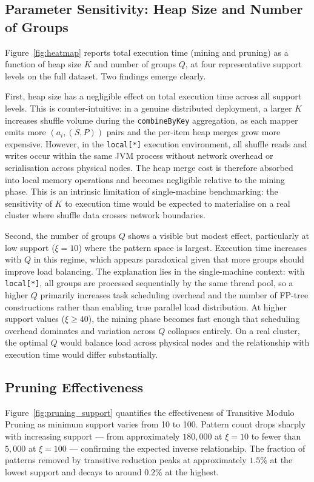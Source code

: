 \documentclass[10pt, twocolumn]{article}
\begin{document}
\subsection{Parameter Sensitivity: Heap Size and Number of Groups}

Figure~\ref{fig:heatmap} reports total execution time (mining and pruning) as
a function of heap size $K$ and number of groups $Q$, at four representative
support levels on the full dataset. Two findings emerge clearly.

First, heap size has a negligible effect on total execution time across all
support levels. This is counter-intuitive: in a genuine distributed
deployment, a larger $K$ increases shuffle volume during the
\texttt{combineByKey} aggregation, as each mapper emits more
$(a_i, (S, P))$ pairs and the per-item heap merges grow more expensive.
However, in the \texttt{local[*]} execution environment, all shuffle reads
and writes occur within the same JVM process without network overhead or
serialisation across physical nodes. The heap merge cost is therefore absorbed
into local memory operations and becomes negligible relative to the mining
phase. This is an intrinsic limitation of single-machine benchmarking: the
sensitivity of $K$ to execution time would be expected to materialise on a
real cluster where shuffle data crosses network boundaries.

Second, the number of groups $Q$ shows a visible but modest effect,
particularly at low support ($\xi{=}10$) where the pattern space is largest.
Execution time increases with $Q$ in this regime, which appears paradoxical
given that more groups should improve load balancing. The explanation lies in
the single-machine context: with \texttt{local[*]}, all groups are processed
sequentially by the same thread pool, so a higher $Q$ primarily increases
task scheduling overhead and the number of FP-tree constructions rather than
enabling true parallel load distribution. At higher support values ($\xi \geq
40$), the mining phase becomes fast enough that scheduling overhead dominates
and variation across $Q$ collapses entirely. On a real cluster, the optimal
$Q$ would balance load across physical nodes and the relationship with
execution time would differ substantially.

\subsection{Pruning Effectiveness}

Figure~\ref{fig:pruning_support} quantifies the effectiveness of Transitive
Modulo Pruning as minimum support varies from 10 to 100. Pattern count drops
sharply with increasing support — from approximately $180{,}000$ at
$\xi{=}10$ to fewer than $5{,}000$ at $\xi{=}100$ — confirming the expected
inverse relationship. The fraction of patterns removed by transitive reduction
peaks at approximately $1.5\%$ at the lowest support and decays to around
$0.2\%$ at the highest.
\end{document}
